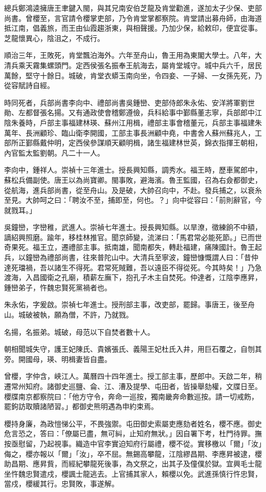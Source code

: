 \begin{pinyinscope}
總兵鄭鴻逵擁唐王聿鍵入閩，與其兄南安伯芝龍及肯堂勸進，遂加太子少保、吏部尚書。曾櫻至，言官請令櫻掌吏部，乃令肯堂掌都察院。肯堂請出募舟師，由海道抵江南，倡義旅，而王由仙霞趨浙東，與相聲援。乃加少保，給敕印，便宜從事。芝龍懷異心，陰沮之，不成行。

順治三年，王敗死，肯堂飄泊海外。六年至舟山，魯王用為東閣大學士。八年，大清兵乘天霧集螺頭門。定西侯張名振奉王航海去，屬肯堂城守。城中兵六千，居民萬餘，堅守十餘日。城破，肯堂衣蟒玉南向坐，令四妾、一子婦、一女孫先死，乃從容賦詩自經。

時同死者，兵部尚書李向中、禮部尚書吳鍾巒、吏部侍郎朱永佑、安洋將軍劉世勛、左都督張名揚。又有通政使會稽鄭遵儉，兵科給事中鄞縣董志寧，兵部郎中江陰朱養時，戶部主事福建林瑛、蘇州江用楫，禮部主事會稽董元，兵部主事福建朱萬年、長洲顧珍、臨山衛李開國，工部主事長洲顧中堯，中書舍人蘇州蘇兆人，工部所正鄞縣戴仲明，定西侯參謀順天顧明楫，諸生福建林世英，錦衣指揮王朝相，內官監太監劉朝。凡二十一人。

李向中，鍾祥人。崇禎十三年進士。授長興知縣，調秀水。福王時，歷車駕郎中，蘇松兵備副使。唐王以為尚寶卿。閩事敗，避海濱。魯王監國，召為右僉都御史，從航海，進兵部尚書，從至舟山。及是破，大帥召向中，不赴。發兵捕之，以衰糸至見。大帥呵之曰：「聘汝不至，捕即至，何也。？」向中從容曰：「前則辭官，今就戮耳。」

吳鐘巒，字巒稚，武進人。崇禎七年進士。授長興知縣。以旱潦，徵練餉不中額，謫紹興照磨。踰年，移桂林推官。聞京師變，流涕曰：「馬君常必能死節。」已而世奇果死。福王立，遷禮部主事。抵南雄，聞南都失，轉赴福建，痛陳國計。魯王起兵，以鐘巒為禮部尚書，往來普陀山中。大清兵至寧波，鐘巒慷慨謂人曰：「昔仲達死璫禍，吾以諸生不得死。君常死賊難，吾以遠臣不得從死。今其時矣！」乃急渡海，入昌國衛之孔廟，積薪左廡下，抱孔子木主自焚死。仲達者，江陰李應昇，鍾巒弟子，忤魏忠賢死黨禍者也。

朱永佑，字爰啟。崇禎七年進士。授刑部主事，改吏部，罷歸。事唐王，後至舟山。城破被執，願為僧，不許，乃就戮。

名揚，名振弟。城破，母范以下自焚者數十人。

朝相聞城失守，護王妃陳氏、貴嬪張氏、義陽王妃杜氏入井，用巨石覆之，自刎其旁。開國母，瑛、明楫妻皆自盡。

曾櫻，字仲含，峽江人。萬曆四十四年進士。授工部主事，歷郎中。天啟二年，稍遷常州知府。諸御史巡鹽、侖、江、漕及提學、屯田者，皆操舉劾權，文牒日至。櫻牒南京都察院曰：「他方守令，奔命一巡按，獨南畿奔命數巡按。請一切戒飭，罷鉤訪取贖諸陋習。」都御史熊明遇為申約束焉。

櫻持身廉，為政愷悌公平，不畏強禦。屯田御史索屬吏應劾者姓名，櫻不應。御史危言恐之，答曰：「僚屬已盡，無可糾，止知府無狀。」因自署下考，杜門待罪。撫按亟慰留，乃起視事。織造中官李實迫知府行屬禮，櫻不從。實移檄以「爾」「汝」侮之，櫻亦報以「爾」「汝」，卒不屈。無錫高攀龍，江陰繆昌期、李應昇被逮，櫻助昌期、應昇貲，而經紀攀龍死後事，為文祭之，出其子及僮僕於獄。宜興毛士龍坐忤魏忠賢遣戍，櫻諷士龍逃去。上官捕其家人，賴櫻以免。武進孫慎行忤忠賢，當戍，櫻緩其行。忠賢敗，事遂解。


\end{pinyinscope}
